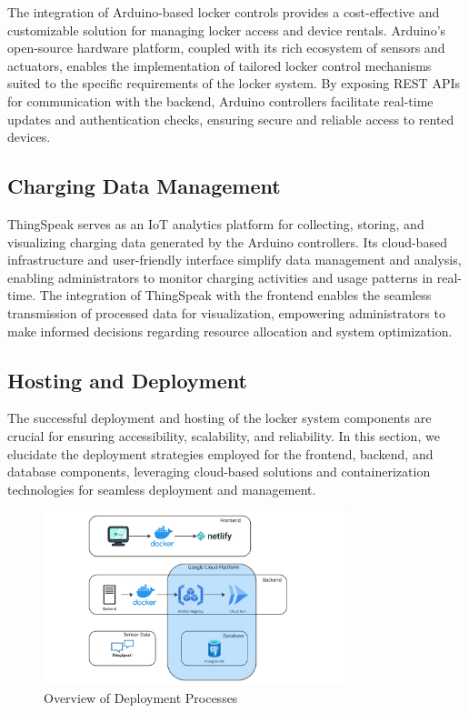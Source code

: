 The integration of Arduino-based locker controls provides a cost-effective and
customizable solution for managing locker access and device rentals. Arduino's open-source
hardware platform, coupled with its rich ecosystem of sensors and actuators, enables the
implementation of tailored locker control mechanisms suited to the specific requirements of
the locker system. By exposing REST APIs for communication with the backend, Arduino controllers
facilitate real-time updates and authentication checks, ensuring secure and reliable access to
rented devices.

\subsection{Charging Data Management}

ThingSpeak serves as an IoT analytics platform for collecting, storing, and visualizing
charging data generated by the Arduino controllers. Its cloud-based infrastructure and
user-friendly interface simplify data management and analysis, enabling administrators to
monitor charging activities and usage patterns in real-time. The integration of ThingSpeak
with the frontend enables the seamless transmission of processed data for visualization,
empowering administrators to make informed decisions regarding resource allocation and system
optimization.

\subsection{Hosting and Deployment}

The successful deployment and hosting of the locker system components are crucial for ensuring accessibility, scalability, and reliability. In this section, we elucidate the deployment strategies employed for the frontend, backend, and database components, leveraging cloud-based solutions and containerization technologies for seamless deployment and management.

\begin{figure}[h]
    \centering
    \includegraphics[width=0.8\textwidth]{images/software_design_deployment}
    \caption{Overview of Deployment Processes}
    \label{fig:deployment_overview}
\end{figure}

